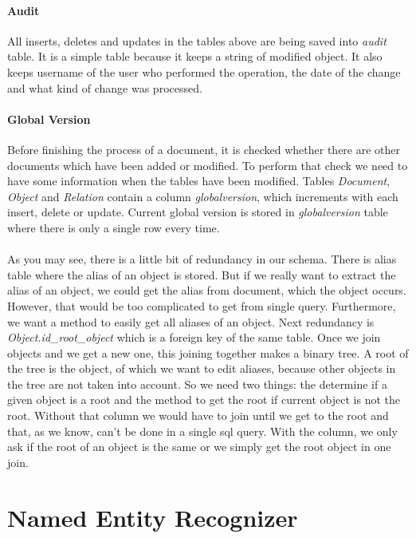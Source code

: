 \paragraph{Audit} All inserts, deletes and updates in the tables above are being saved into \emph{audit} 
table. It is a simple table because it keeps a string of modified object. It also 
keeps username of the user who performed the operation, the date of the change and what kind 
of change was processed.
 
\paragraph{Global Version} Before finishing the process of a document, it is checked whether there
are other documents which have been added or modified. To perform that check we need to have some information
when the tables have been modified. Tables \emph{Document}, \emph{Object} and \emph{Relation} 
contain a column \emph{globalversion}, which increments with each insert, delete or update. 
Current global version is stored in \emph{globalversion} table where there is only a single row every time.

\paragraph{} As you may see, there is a little bit of redundancy in our schema. There is alias table where the alias of an object is stored. But if we really want to extract the alias of an object, we could get the alias from document, which the object occurs. However, that would be too complicated to get from single query. Furthermore, we want a method to easily get all aliases of an object.
Next redundancy is \emph{Object.id\_{}root\_{}object} which is a foreign key of the same table. Once we join objects and we get a new one, this joining together makes a binary tree. A root of the tree is the object, of which we want to edit aliases, because other objects in the tree are not taken into account. So we need two things: the determine if a given object is a root and the method to get the root if current object is not the root. Without that column we would have to join until we get to the root and that, as we know, can't be done in a single sql query. With the column, we only ask if the root of an object is the same or we simply get the root object in one join.


\section{Named Entity Recognizer}
\label{sec:NamedEntityRecognizer}

